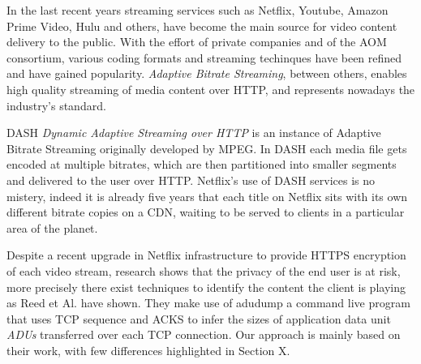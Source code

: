 
In the last recent years streaming services such as Netflix, Youtube, Amazon
Prime Video, Hulu and others, have become the main source for video content
delivery to the public. With the effort of private companies and of the AOM
consortium, various coding formats and streaming techinques have been refined
and have gained popularity. \textit{Adaptive Bitrate Streaming}, between
others, enables high quality streaming of media content over HTTP, and
represents nowadays the industry's standard. 

DASH \textit{Dynamic Adaptive Streaming over HTTP} is an instance of Adaptive
Bitrate Streaming originally developed by MPEG. In DASH each media file gets
encoded at multiple bitrates, which are then partitioned into smaller segments
and delivered to the user over HTTP.  Netflix's use of DASH services is no
mistery, indeed it is already five years that each title on Netflix sits with
its own different bitrate copies on a CDN, waiting to be served to clients in a
particular area of the planet. \cite{per-title-encoding}

Despite a recent upgrade in Netflix infrastructure to provide HTTPS encryption
of each video stream, research shows that the privacy of the end user is at
risk, more precisely there exist techniques to identify the content the client
is playing as Reed et Al. \cite{netflix-real-time} have shown. They make use of
adudump \cite{adudump} a command live program that uses TCP sequence and ACKS
to infer the sizes of application data unit \emph{ADUs} transferred over each
TCP connection. Our approach is mainly based on their work, with few
differences highlighted in Section X.

